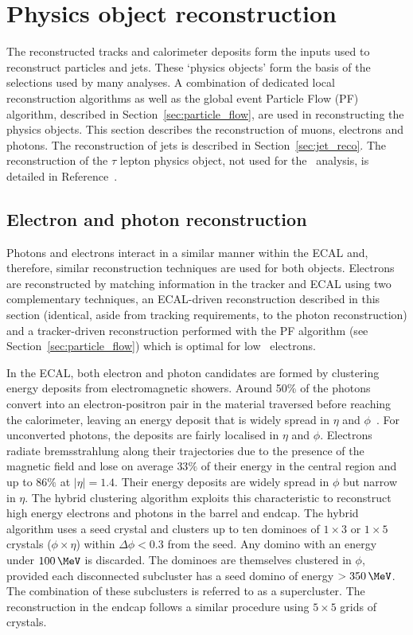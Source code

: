 \section{Physics object reconstruction}

The reconstructed tracks and calorimeter deposits form 
the inputs used to reconstruct particles and jets. These `physics objects'
form the basis of the selections used by many analyses. A combination 
of dedicated local reconstruction algorithms as well as the global event Particle
Flow (PF) algorithm, described in Section~\ref{sec:particle_flow}, are used in 
reconstructing the physics objects. This section describes the reconstruction
of muons, electrons and photons. The reconstruction of jets
is described in Section~\ref{sec:jet_reco}. The reconstruction of
the $\tau$ lepton physics object, not used for the \alphat~analysis, is 
detailed in Reference~\cite{Khachatryan:2062435}.


\subsection{Electron and photon reconstruction}
\label{sec:ele_pho_reco}

Photons and electrons interact in a similar manner within the ECAL and, therefore, similar reconstruction techniques
are used for both objects. Electrons are reconstructed by matching 
information in the tracker and ECAL using two complementary techniques, an ECAL-driven 
reconstruction described in this section (identical, aside from tracking
requirements, to the photon reconstruction) and a tracker-driven reconstruction performed with
the PF algorithm (see Section~\ref{sec:particle_flow}) which is optimal for low \pt~electrons. 

In the ECAL, both electron and photon candidates are formed by clustering energy deposits
from electromagnetic showers. Around 50\% of the photons convert into an electron-positron 
pair in the material traversed before reaching the calorimeter, leaving an energy deposit that is widely 
spread in $\eta$ and $\phi$~\cite{Argiro:2010zz}.  For unconverted photons, the 
deposits are fairly localised in $\eta$ and $\phi$. Electrons radiate
bremsstrahlung along their trajectories due to the presence of the magnetic field and 
lose on average $33\%$ of their energy in the central region 
and up to $86\%$ at $|\eta| = 1.4$. Their energy deposits are widely spread in $\phi$ but narrow in $\eta$. 
The hybrid clustering algorithm exploits this characteristic to
reconstruct high energy electrons and photons in the barrel and endcap. The hybrid algorithm
uses a seed crystal and clusters up to ten dominoes of $1\times3$ or $1\times5$ crystals ($\phi\times\eta$) within 
$\Delta\phi < 0.3$ from the seed. Any domino with an energy under $100\,\MeV$ is discarded. The dominoes
are themselves clustered in $\phi$, provided each disconnected subcluster has a seed 
domino of energy $>350\,\MeV$. The combination of these subclusters is referred 
to as a supercluster. The reconstruction in the endcap follows a similar procedure 
using $5\times5$ grids of crystals. 

